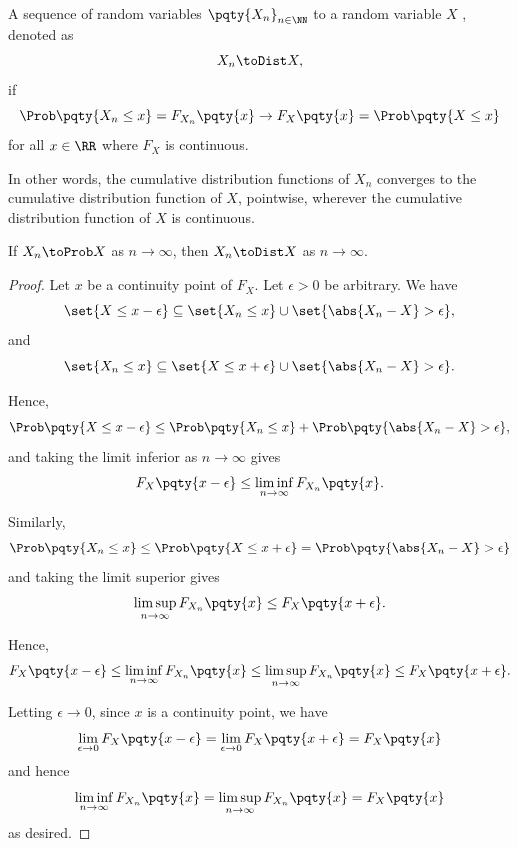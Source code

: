 \begin{definition}
    \label{def:convergence-in-distribution}%
    A sequence of random variables \(\pqty{X_n}_{n \in \NN}\)  to a random variable \(X\) , denoted as
    \[
        X_n \toDist X,
    \]
    if
    \[
        \Prob\pqty{X_n \leq x} = F_{X_n} \pqty{x} \to F_X \pqty{x} = \Prob\pqty{X \leq x}
    \]
    for all \(x \in \RR\) where \(F_X\) is continuous.
    
    In other words, the cumulative distribution functions of \(X_n\) converges to the cumulative distribution function of \(X\), pointwise, wherever the cumulative distribution function of \(X\) is continuous.
\end{definition}

\begin{claim}
    \label{claim:convergence-in-probability-implies-converges-in-distribution}%
    If \(X_n \toProb X\) as \(n \to \infty\), then \(X_n \toDist X\) as \(n \to \infty\).
\end{claim}

\begin{proof}
    Let \(x\) be a continuity point of \(F_X\). Let \(\epsilon > 0\) be arbitrary. We have
    \[
        \set{X \leq x - \epsilon} \subseteq \set{X_n \leq x} \cup \set{\abs{X_n - X} > \epsilon},
    \]
    and
    \[
        \set{X_n \leq x} \subseteq \set{X \leq x + \epsilon} \cup \set{\abs{X_n - X} > \epsilon}.
    \]

    Hence,
    \[
        \Prob\pqty{X \leq x - \epsilon} \leq \Prob\pqty{X_n \leq x} + \Prob\pqty{\abs{X_n - X} > \epsilon},
    \]
    and taking the limit inferior as \(n \to \infty\) gives
    \[
        F_X \pqty{x - \epsilon} \leq \liminf_{n \to \infty} F_{X_n} \pqty{x}.
    \]

    Similarly,
    \[
        \Prob\pqty{X_n \leq x} \leq \Prob\pqty{X \leq x + \epsilon} = \Prob\pqty{\abs{X_n - X} > \epsilon}
    \]
    and taking the limit superior gives
    \[
        \limsup_{n \to \infty} F_{X_n} \pqty{x} \leq F_X \pqty{x + \epsilon}.
    \]

    Hence,
    \[
        F_{X} \pqty{x - \epsilon} \leq \liminf_{n \to \infty} F_{X_n} \pqty{x} \leq \limsup_{n \to \infty} F_{X_n} \pqty{x} \leq F_X \pqty{x + \epsilon}.
    \]

    Letting \(\epsilon \to 0\), since \(x\) is a continuity point, we have
    \[
        \lim_{\epsilon \to 0} F_X\pqty{x - \epsilon} = \lim_{\epsilon \to 0} F_X\pqty{x + \epsilon} = F_X\pqty{x}
    \]
    and hence
    \[
        \liminf_{n \to \infty} F_{X_n} \pqty{x} = \limsup_{n \to \infty} F_{X_n} \pqty{x} = F_X \pqty{x}
    \]
    as desired.
\end{proof}

